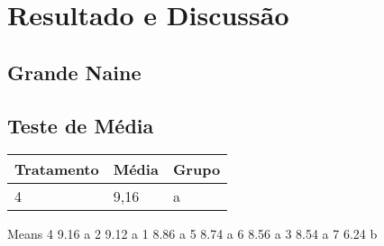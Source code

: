 \chapter{Resultado e Discussão}
\section{Grande Naine}

\section{Teste de Média}
  
 
 \begin{table}[htb]
 	\center
 	\footnotesize
 	\begin{tabular}{|p{1.4cm}|p{1cm}|p{3cm}}
 		\hline
 		\textbf{Tratamento} & \textbf{Média}  & \textbf{Grupo}\\
 		\hline
 		4 & 9,16 & a & \\
 		\hline
 	\end{tabular}
 \end{table}
  
  Means 
4  9.16  a   
2  9.12  a   
1  8.86  a   
5  8.74  a   
6  8.56  a   
3  8.54  a   
7  6.24     b